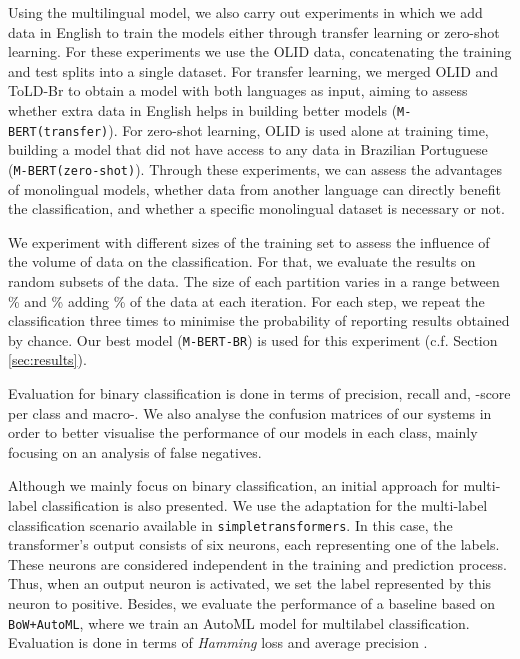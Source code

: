 \documentclass[11pt,a4paper]{article}
\begin{document}
Using the multilingual model, we also carry out experiments in which we add data in English to train the models either through transfer learning or zero-shot learning. For these experiments we use the OLID data, concatenating the training and test splits into a single dataset. For transfer learning, we merged OLID and ToLD-Br to obtain a model with both languages as input, aiming to assess whether extra data in English helps in building better models (\texttt{M-BERT(transfer)}). For zero-shot learning, OLID is used alone at training time, building a model that did not have access to any data in Brazilian Portuguese (\texttt{M-BERT(zero-shot)}). Through these experiments, we can assess the advantages of monolingual models, whether data from another language can directly benefit the classification, and whether a specific monolingual dataset is necessary or not.

We experiment with different sizes of the training set to assess the influence of the volume of data on the classification. For that, we evaluate the results on random subsets of the data. The size of each partition varies in a range between \% and \% adding \% of the data at each iteration. For each step, we repeat the classification three times to minimise the probability of reporting results obtained by chance. Our best model (\texttt{M-BERT-BR}) is used for this experiment (c.f. Section \ref{sec:results}).

Evaluation for binary classification is done in terms of precision, recall and, -score per class and macro-. We also analyse the confusion matrices of our systems in order to better visualise the performance of our models in each class, mainly focusing on an analysis of false negatives. 

Although we mainly focus on binary classification, an initial approach for multi-label classification is also presented. We use the adaptation for the multi-label classification scenario available in \texttt{simpletransformers}. In this case, the transformer's output consists of six neurons, each representing one of the labels. These neurons are considered independent in the training and prediction process. Thus, when an output neuron is activated, we set the label represented by this neuron to positive.
Besides, we evaluate the performance of a baseline based on \texttt{BoW+AutoML}, where we train an AutoML model for multilabel classification. Evaluation is done in terms of \textit{Hamming} loss and average precision \cite{tsoumakas2009mining}.
\end{document}
